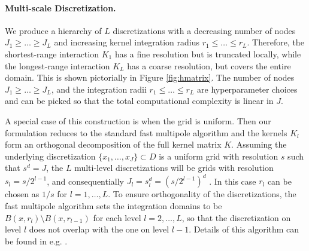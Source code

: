 \paragraph{Multi-scale Discretization.}
We produce a hierarchy of $L$ discretizations with a decreasing number of nodes $J_1 \geq \ldots \geq J_L$ and increasing kernel integration radius $r_1  \leq \ldots \leq r_L$. Therefore, the shortest-range interaction $K_1$ has a fine resolution but is truncated locally, while the longest-range interaction $K_L$ has a coarse resolution, but covers the entire domain. This is shown pictorially in Figure \ref{fig:hmatrix}.
The number of nodes $J_1 \geq \ldots \geq J_L$, and the integration radii $r_1  \leq \ldots \leq r_L$ are hyperparameter choices and can be picked so that the total computational complexity is linear in \(J\). 

A special case of this construction is when the grid is uniform. Then our formulation reduces to the standard fast multipole algorithm and the kernels $K_l$ form an orthogonal decomposition of the full kernel matrix $K$.
Assuming the underlying discretization \(\{x_1,\dots,x_J\} \subset D\) is a uniform grid with resolution $s$ such that $s^d = J$, the $L$ multi-level discretizations will be grids with resolution $s_l = s/2^{l-1}$, and consequentially $J_l = s_l^d = (s/2^{l-1})^d$ . In this case $r_l$ can be chosen as $1/s$ for \(l=1,\dots,L\).
To ensure orthogonality of the discretizations, the fast multipole algorithm sets the integration domains to be $B(x, r_l) \setminus B(x, r_{l-1})$ for each level \(l=2,\dots,L\), so that the discretization on level $l$ does not overlap with the one on level $l-1$. Details of this algorithm can be found in e.g. \citet{greengard1997new}.

